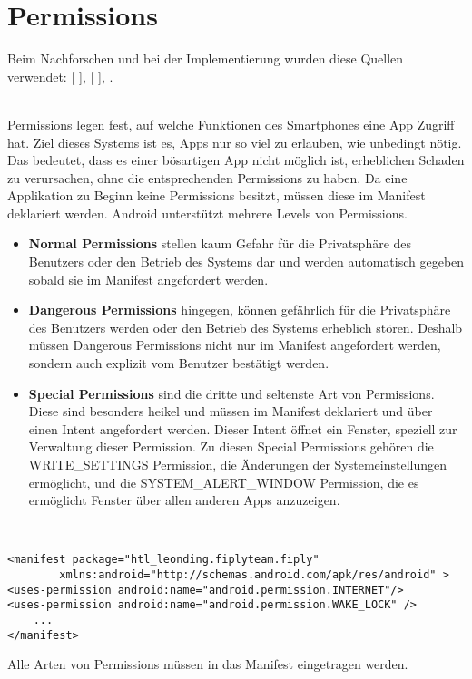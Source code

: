 \documentclass[FIPLY_base.tex]{subfiles}
\author{Andreas Denkmayr}
\date{25. Februar 2016}
\begin{document}
\section{Permissions}
Beim Nachforschen und bei der Implementierung wurden diese Quellen verwendet: 
[ \cite{bPermissions}],
[ \cite{adTPermissions}], .

\ \\
Permissions legen fest, auf welche Funktionen des Smartphones eine App Zugriff hat.
Ziel dieses Systems ist es, Apps nur so viel zu erlauben, wie unbedingt nötig.
Das bedeutet, dass es einer bösartigen App nicht möglich ist, erheblichen Schaden zu verursachen, ohne die entsprechenden Permissions zu haben.
Da eine Applikation zu Beginn keine Permissions besitzt, müssen diese im Manifest deklariert werden.
Android unterstützt mehrere Levels von Permissions.
\begin{itemize}
\item \textbf{Normal Permissions} stellen kaum Gefahr für die Privatsphäre des Benutzers oder den Betrieb des Systems dar und werden automatisch gegeben sobald sie im Manifest angefordert werden.

\item \textbf{Dangerous Permissions} hingegen, können gefährlich für die Privatsphäre des Benutzers werden oder den Betrieb des Systems erheblich stören. 
Deshalb müssen Dangerous Permissions nicht nur im Manifest angefordert werden, sondern auch explizit vom Benutzer bestätigt werden.

\item \textbf{Special Permissions} sind die dritte und seltenste Art von Permissions. 
Diese sind besonders heikel und müssen im Manifest deklariert und über einen Intent angefordert werden.
Dieser Intent öffnet ein Fenster, speziell zur Verwaltung dieser Permission. \newline
Zu diesen Special Permissions gehören die WRITE\_SETTINGS Permission, die Änderungen der Systemeinstellungen ermöglicht, 
und die SYSTEM\_ALERT\_WINDOW Permission, die es ermöglicht Fenster über allen anderen Apps anzuzeigen.
\end{itemize}
\ \\
\begin{lstlisting}
<manifest package="htl_leonding.fiplyteam.fiply"
		xmlns:android="http://schemas.android.com/apk/res/android" >
<uses-permission android:name="android.permission.INTERNET"/>
<uses-permission android:name="android.permission.WAKE_LOCK" />
	...
</manifest>
\end{lstlisting}
Alle Arten von Permissions müssen in das Manifest eingetragen werden.
\end{document}

